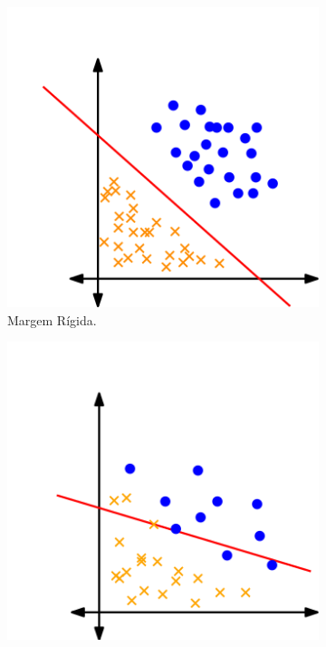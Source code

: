 \documentclass[12pt,a4paper]{scrartcl}
\theoremstyle{definition}%
\begin{document}
\begin{figure}[!ht] 
\centering
\begin{subfigure}[h]{0.3\textwidth}
\centering
\includegraphics[width=\textwidth]{hiperplano_SVM_linear}
\caption{Margem Rígida. \label{fig:hiperplano_margemrigida}}
\end{subfigure}
\begin{subfigure}[!ht]{0.3\textwidth}
	\centering
	\includegraphics[width=\textwidth]{hiperplano_SVM_flexivel}

\end{subfigure}
\end{figure}
\end{document}

